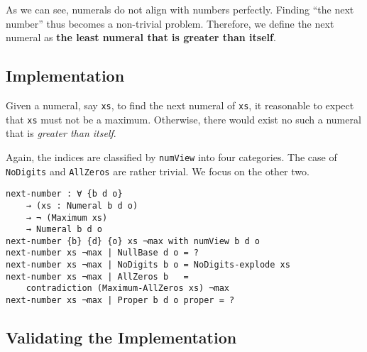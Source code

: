 \documentclass[\main/thesis.tex]{subfiles}
\begin{document}
\begin{center}
    \begin{adjustbox}{max width=\textwidth}
    \end{adjustbox}
\end{center}

As we can see, numerals do not align with numbers perfectly.
Finding ``the next number'' thus becomes a non-trivial problem.
Therefore, we define the next numeral as \textbf{the least numeral that is greater than itself}.

\subsection{Implementation}

Given a numeral, say {\lstinline|xs|}, to find the next numeral of {\lstinline|xs|},
it reasonable to expect that {\lstinline|xs|} must not be a maximum.
Otherwise, there would exist no such a numeral that is \textit{greater than itself}.

Again, the indices are classified by {\lstinline|numView|} into four categories.
The case of {\lstinline|NoDigits|} and {\lstinline|AllZeros|} are rather trivial.
We focus on the other two.

\begin{lstlisting}
next-number : ∀ {b d o}
    → (xs : Numeral b d o)
    → ¬ (Maximum xs)
    → Numeral b d o
next-number {b} {d} {o} xs ¬max with numView b d o
next-number xs ¬max | NullBase d o = ?
next-number xs ¬max | NoDigits b o = NoDigits-explode xs
next-number xs ¬max | AllZeros b   =
    contradiction (Maximum-AllZeros xs) ¬max
next-number xs ¬max | Proper b d o proper = ?
\end{lstlisting}

\subsection{Validating the Implementation}
\end{document}
